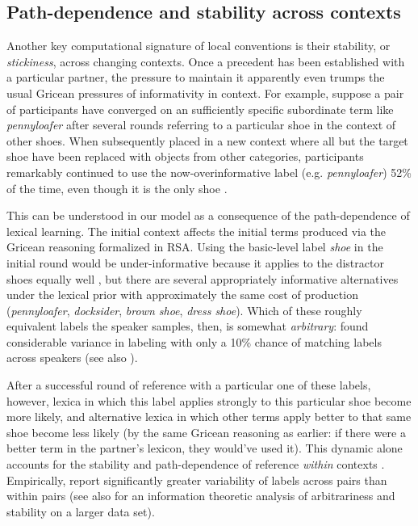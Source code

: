 \documentclass[11pt, floatsintext, jou]{apa6}
\begin{document}
\subsection{Path-dependence and stability across contexts}

Another key computational signature of local conventions is their stability, or \emph{stickiness}, across changing contexts. Once a precedent has been established with a particular partner, the pressure to maintain it apparently even trumps the usual Gricean pressures of informativity in context. For example, suppose a pair of participants have converged on an sufficiently specific subordinate term like \emph{pennyloafer} after several rounds referring to a particular shoe in the context of other shoes. %
When subsequently placed in a new context where all but the target shoe have been replaced with objects from other categories, participants remarkably continued to use the now-overinformative label (e.g. \emph{pennyloafer}) 52\% of the time, even though it is the only shoe \cite{BrennanClark96_ConceptualPactsConversation}.

This can be understood in our model as a consequence of the path-dependence of lexical learning. The initial context affects the initial terms produced via the Gricean reasoning formalized in RSA. Using the basic-level label \emph{shoe} in the initial round would be under-informative because it applies to the distractor shoes equally well \cite{GrafEtAl16_BasicLevel}, but there are several appropriately informative alternatives under the lexical prior with approximately the same cost of production (\emph{pennyloafer}, \emph{docksider}, \emph{brown shoe}, \emph{dress shoe}). Which of these roughly equivalent labels the speaker samples, then, is somewhat \emph{arbitrary}:  found considerable variance in labeling with only a 10\% chance of matching labels across speakers (see also ). 

After a successful round of reference with a particular one of these labels, however, lexica in which this label applies strongly to this particular shoe become more likely, and alternative lexica in which other terms apply better to that same shoe become less likely (by the same Gricean reasoning as earlier: if there were a better term in the partner's lexicon, they would've used it). This dynamic alone accounts for the stability and path-dependence of reference \emph{within} contexts \cite{HawkinsFrankGoodman17_ConventionFormation}. Empirically,  report significantly greater variability of labels across pairs than within pairs (see also  for an information theoretic analysis of arbitrariness and stability on a larger data set). 
\end{document}
